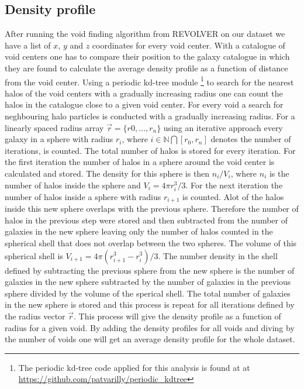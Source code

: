 \subsection{Density profile}\label{sec:voiddensity}
After running the void finding algorithm from REVOLVER on our dataset we have a list of $x$, $y$
and $z$ coordinates for every void center. With a catalogue of void centers one
has to compare their position to the galaxy catalogue in which they are found to
calculate the average density profile as a function of distance from the void
center. Using a periodic kd-tree module \footnote{The periodic kd-tree code
applied for this analysis is found at at \url{https://github.com/patvarilly/periodic_kdtree}} to search for
the nearest halos of the void centers with a gradually increasing radius one can count the halos in
the catalogue close to a given void center. For every void a search for
neghbouring halo particles is conducted with a gradually increasing radius. For
a linearly spaced radius array $\vec{r}=\{r0,\dots,r_{n}\}$ using an iterative
approach every galaxy in a sphere with radius $r_{i}$, where
$i\in\mathbb{N}\bigcap [r_0,r_{n}]$ denotes the
number of iterations, is counted. The total number of halos is stored for
every iteration. For the first iteration the number of halos in a sphere around the void
center is calculated and stored. The density for this sphere is then $n_i/V_i$,
where $n_i$ is the number of halos inside the sphere and $V_i=4\pi r_{i}^3/3$. For
the next iteration the number of halos inside a sphere with radius $r_{i+1}$ is
counted. Alot of the halos inside this new sphere overlaps with the previous
sphere. Therefore the number of halos in the previous step were stored and then
subtracted from the number of galaxies in the new sphere leaving only the number
of halos counted in the spherical shell that does not overlap between the two
spheres. The volume of this spherical shell is $V_{i+1}=4\pi(r_{i+1}^3-r_i^3)/3$. The
number density in the shell defined by subtracting the previous sphere from the
new sphere is the number of galaxies in the new sphere subtracted by the number
of galaxies in the previous sphere divided by the volume of the sperical shell.
The total number of galaxies in the new sphere is stored and this process is
repeat for all iterations defined by the radius vector $\vec{r}$. This process
will give the density profile as a function of radius for a given void. By
adding the density profiles for all voids and diving by the number of voids one
will get an average density profile for the whole dataset.
